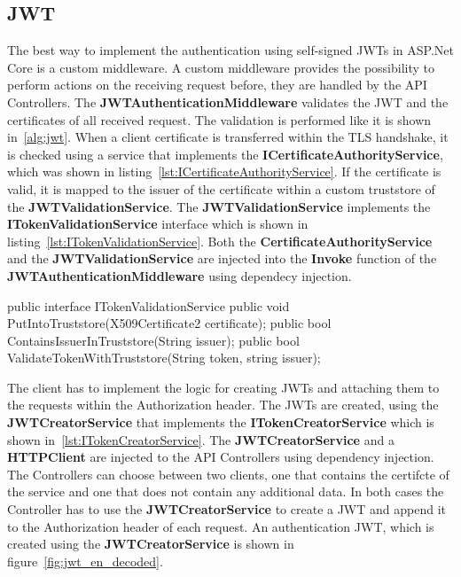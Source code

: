 \subsection{JWT}
The best way to implement the authentication using self-signed JWTs in ASP.Net Core is a custom middleware.
A custom middleware provides the possibility to perform actions on the receiving request before, they are handled by the API Controllers.
The \textbf{JWTAuthenticationMiddleware} validates the JWT and the certificates of all received request.
The validation is performed like it is shown in~\ref{alg:jwt}.
When a client certificate is transferred within the TLS handshake, it is checked using a service that implements the \textbf{ICertificateAuthorityService}, which was shown in listing~\ref{lst:ICertificateAuthorityService}.
If the certificate is valid, it is mapped to the issuer of the certificate within a custom truststore of the \textbf{JWTValidationService}.
The \textbf{JWTValidationService} implements the \textbf{ITokenValidationService} interface which is shown in listing~\ref{lst:ITokenValidationService}.
Both the \textbf{CertificateAuthorityService} and the \textbf{JWTValidationService} are injected into the \textbf{Invoke} function of the \textbf{JWTAuthenticationMiddleware} using dependecy injection.

\noindent \begin{minipage}{\linewidth}
	\begin{CsCode}[label={lst:ITokenValidationService}, caption={ITokenValidationService interface, which is implemented by the injected JWTValidationService},captionpos=b]
		public interface ITokenValidationService {
			public void PutIntoTruststore(X509Certificate2 certificate);
			public bool ContainsIssuerInTruststore(String issuer);
			public bool ValidateTokenWithTruststore(String token, string issuer);
		}
	\end{CsCode}
\end{minipage}

The client has to implement the logic for creating JWTs and attaching them to the requests within the Authorization header.
The JWTs are created, using the \textbf{JWTCreatorService} that implements the \textbf{ITokenCreatorService} which is shown in~\ref{lst:ITokenCreatorService}.
The \textbf{JWTCreatorService} and a \textbf{HTTPClient} are injected to the API Controllers using dependency injection.
The Controllers can choose between two clients, one that contains the certifcte of the service and one that does not contain any additional data.
In both cases the Controller has to use the \textbf{JWTCreatorService} to create a JWT and append it to the Authorization header of each request.
An authentication JWT, which is created using the \textbf{JWTCreatorService} is shown in figure~\ref{fig:jwt_en_decoded}.


